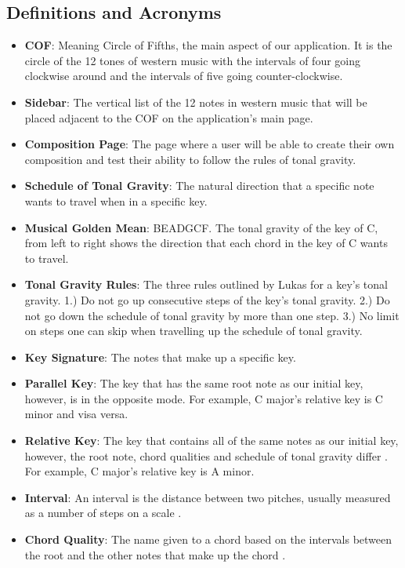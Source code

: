 \documentclass[onecolumn, draftclsnofoot,10pt, compsoc]{IEEEtran}
\begin{document}
\subsection{Definitions and Acronyms}
\begin{itemize}
\item \textbf{COF}: 
  Meaning Circle of Fifths, the main aspect of our application. 
  It is the circle of the 12 tones of western music with the intervals of four going clockwise around and the intervals of five going counter-clockwise.
\item \textbf{Sidebar}:
  The vertical list of the 12 notes in western music that will be placed adjacent to the COF on the application’s main page.
\item \textbf{Composition Page}:
  The page where a user will be able to create their own composition and test their ability to follow the rules of tonal gravity.
\item \textbf{Schedule of Tonal Gravity}:
  The natural direction that a specific note wants to travel when in a specific key.
\item \textbf{Musical Golden Mean}: BEADGCF.
  The tonal gravity of the key of C, from left to right shows the direction that each chord in the key of C wants to travel.
\item \textbf{Tonal Gravity Rules}: 
  The three rules outlined by Lukas for a key’s tonal gravity. 
  1.) Do not go up consecutive steps of the key’s tonal gravity.
  2.) Do not go down the schedule of tonal gravity by more than one step.
  3.) No limit on steps one can skip when travelling up the schedule of tonal gravity.
\item \textbf{Key Signature}:
  The notes that make up a specific key.
\item \textbf{Parallel Key}:
  The key that has the same root note as our initial key, however, is in the opposite mode.
  For example, C major’s relative key is C minor and visa versa.
\item \textbf{Relative Key}:
  The key that contains all of the same notes as our initial key, however, the root note, chord qualities and schedule of tonal gravity differ \cite{omt-keysig}.
  For example, C major’s relative key is A minor.
\item \textbf{Interval}:
  An interval is the distance between two pitches, usually measured as a number of steps on a scale \cite{omt-intervals}.
\item \textbf{Chord Quality}: The name given to a chord based on the intervals between the root and the other notes that make up the chord \cite{omt-triads}.
\end{itemize}
\end{document}

